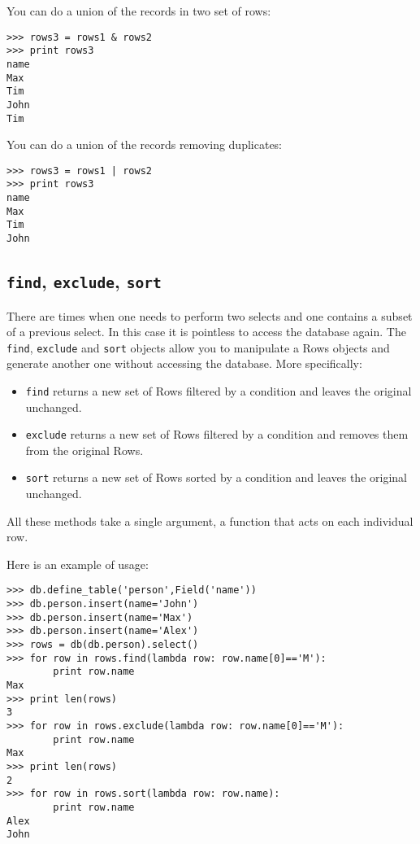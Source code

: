 \documentclass[justified,sixbynine,notoc]{tufte-book}
\def\ft{\small\tt}
\def\inxx#1{\index{#1}}
\begin{document}
\begin{fullwidth}
You can do a union of the records in two set of rows:

\begin{lstlisting}
>>> rows3 = rows1 & rows2
>>> print rows3
name
Max
Tim
John
Tim
\end{lstlisting}

You can do a union of the records removing duplicates:

\begin{lstlisting}
>>> rows3 = rows1 | rows2
>>> print rows3
name
Max
Tim
John
\end{lstlisting}

\goodbreak\subsection{{\ft find}, {\ft exclude}, {\ft sort}}

\inxx{find} \inxx{exclude} \inxx{sort}

There are times when one needs to perform two selects and one contains a subset of a previous select. In this case it is pointless to access the database again. The {\ft find}, {\ft exclude} and {\ft sort} objects allow you to manipulate a Rows objects and generate another one without accessing the database. More specifically:
\begin{itemize}
\item {\ft find} returns a new set of Rows filtered by a condition and leaves the original unchanged.

\item {\ft exclude} returns a new set of Rows filtered by a condition and removes them from the original Rows.

\item {\ft sort} returns a new set of Rows sorted by a condition and leaves the original unchanged.
\end{itemize}

All these methods take a single argument, a function that acts on each individual row.

Here is an example of usage:
\begin{lstlisting}
>>> db.define_table('person',Field('name'))
>>> db.person.insert(name='John')
>>> db.person.insert(name='Max')
>>> db.person.insert(name='Alex')
>>> rows = db(db.person).select()
>>> for row in rows.find(lambda row: row.name[0]=='M'):
        print row.name
Max
>>> print len(rows)
3
>>> for row in rows.exclude(lambda row: row.name[0]=='M'):
        print row.name
Max
>>> print len(rows)
2
>>> for row in rows.sort(lambda row: row.name):
        print row.name
Alex
John
\end{lstlisting}


\end{fullwidth}
\end{document}
